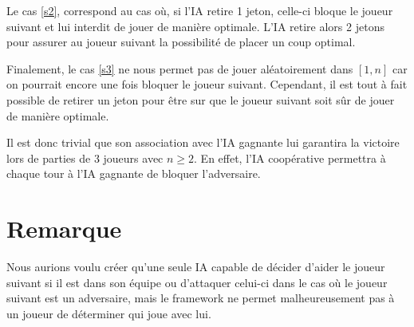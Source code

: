 \documentclass[10pt,a4paper]{article}
\begin{document}
Le cas \eqref{s2}, correspond au cas où, si l'IA retire 1 jeton, celle-ci bloque
le joueur suivant et lui interdit de jouer de manière optimale.
L'IA retire alors 2 jetons pour assurer au joueur suivant la possibilité de
placer un coup optimal.

Finalement, le cas \eqref{s3} ne nous
permet pas de jouer aléatoirement dans $[1, n]$ car on pourrait encore une fois
bloquer le joueur suivant. Cependant, il est tout à fait possible de retirer un
jeton pour être sur que le joueur suivant soit sûr de jouer de manière optimale.

Il est donc trivial que son association avec l'IA gagnante lui garantira
la victoire lors de parties de 3 joueurs avec $n \geq 2$.  En effet,
l'IA coopérative permettra à chaque tour à l'IA gagnante de bloquer
l'adversaire.

\section{Remarque}
Nous aurions voulu créer qu'une seule IA capable de décider d'aider le joueur
suivant si il est dans son équipe ou d'attaquer celui-ci dans le cas où le
joueur suivant est un adversaire, mais le framework ne permet malheureusement
pas à un joueur de déterminer qui joue avec lui.
\end{document}
